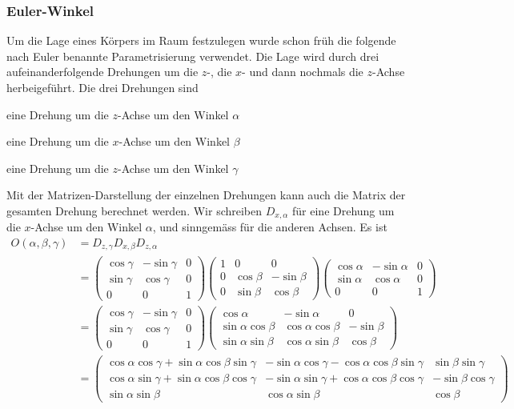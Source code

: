\subsubsection{Euler-Winkel}
Um die Lage eines Körpers im Raum festzulegen wurde schon früh
die folgende nach Euler benannte  Parametrisierung verwendet.
Die Lage wird durch drei aufeinanderfolgende Drehungen um die $z$-,
die $x$- und dann nochmals die $z$-Achse herbeigeführt.
Die drei
Drehungen sind
\begin{compactenum}
\item eine Drehung um die $z$-Achse um den Winkel $\alpha$
\item eine Drehung um die $x$-Achse um den Winkel $\beta$
\item eine Drehung um die $z$-Achse um den Winkel $\gamma$
\end{compactenum}
Mit der Matrizen-Darstellung der einzelnen Drehungen kann auch
die Matrix der gesamten Drehung berechnet werden.
Wir schreiben
$D_{x,\alpha}$ für eine Drehung um die $x$-Achse um den Winkel
$\alpha$, und sinngemäss für die anderen Achsen.
Es ist
\begin{align*}
O(\alpha,\beta,\gamma)
&=
D_{z,\gamma}
D_{x,\beta}
D_{z,\alpha}
\\
&=
\begin{pmatrix}
\cos\gamma&-\sin\gamma&0\\
\sin\gamma&\cos\gamma&0\\
0&0&1
\end{pmatrix}
\begin{pmatrix}
1&0&0\\
0&\cos\beta&-\sin\beta\\
0&\sin\beta&\cos\beta
\end{pmatrix}
\begin{pmatrix}
\cos\alpha&-\sin\alpha&0\\
\sin\alpha&\cos\alpha&0\\
0&0&1
\end{pmatrix}
\\
&=
\begin{pmatrix}
\cos\gamma&-\sin\gamma&0\\
\sin\gamma&\cos\gamma&0\\
0&0&1
\end{pmatrix}
\begin{pmatrix}
\cos\alpha&-\sin\alpha&0\\
\sin\alpha\cos\beta&\cos\alpha\cos\beta&-\sin\beta\\
\sin\alpha\sin\beta&\cos\alpha\sin\beta&\cos\beta
\end{pmatrix}
\\
&=
\begin{pmatrix}
\cos\alpha\cos\gamma+\sin\alpha\cos\beta\sin\gamma
        &-\sin\alpha\cos\gamma-\cos\alpha\cos\beta\sin\gamma
                &\sin\beta\sin\gamma\\
\cos\alpha\sin\gamma+\sin\alpha\cos\beta\cos\gamma
        &-\sin\alpha\sin\gamma+\cos\alpha\cos\beta\cos\gamma
                &-\sin\beta\cos\gamma\\
\sin\alpha\sin\beta&\cos\alpha\sin\beta&\cos\beta
\end{pmatrix}
\end{align*}
